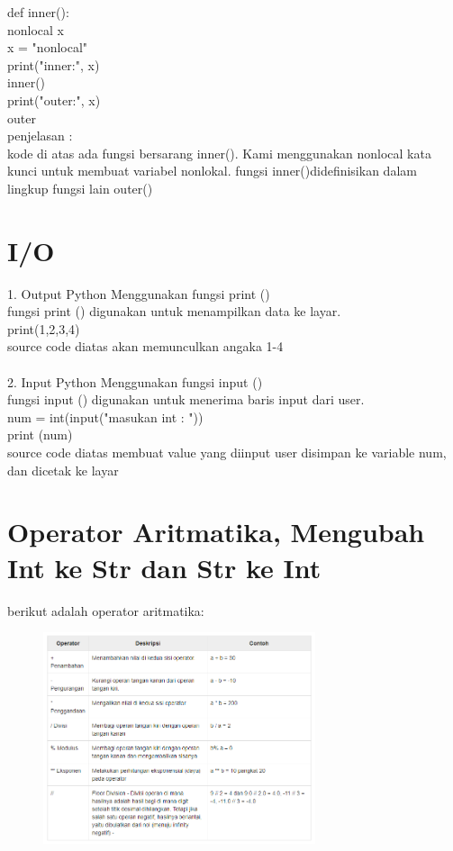     def inner():\\
        nonlocal x\\
        x = "nonlocal"\\
        print("inner:", x)\\
    
    inner()\\
    print("outer:", x)\\

outer\\

penjelasan :\\
kode di atas ada fungsi bersarang inner(). Kami menggunakan nonlocal kata kunci untuk membuat variabel nonlokal. fungsi  inner()didefinisikan dalam lingkup fungsi lain outer()

\section{I/O}

1. Output Python Menggunakan fungsi print ()\\
fungsi print () digunakan untuk menampilkan data ke layar.\\

print(1,2,3,4)\\

source code diatas akan memunculkan angaka 1-4\\
\\

2. Input Python Menggunakan fungsi input ()\\
fungsi input () digunakan untuk menerima baris input dari user.\\

num = int(input("masukan int : "))\\
print (num)\\

source code diatas membuat value yang diinput user disimpan ke variable num, dan dicetak ke layar\\

\section{Operator Aritmatika, Mengubah Int ke Str dan Str ke Int}

berikut adalah operator aritmatika:\\

\begin{figure}[H]
	\centering
	\includegraphics[width=8cm]{figures/xxx.png}
\end{figure}

